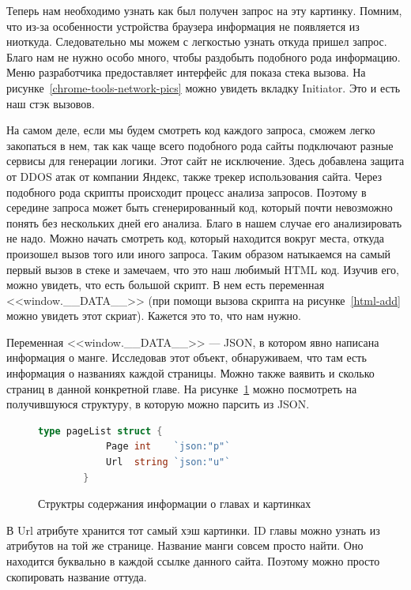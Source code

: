 Теперь нам необходимо узнать как был получен запрос на эту картинку. 
Помним, что из-за особенности устройства браузера информация не появляется из ниоткуда.
Следовательно мы можем с легкостью узнать откуда пришел запрос.
Благо нам не нужно особо много, чтобы раздобыть подобного рода информацию.
Меню разработчика предоставляет интерфейс для показа стека вызова. На рисунке~\ref{chrome-tools-network-pics} можно увидеть вкладку Initiator.
Это и есть наш стэк вызовов.

На самом деле, если мы будем смотреть код каждого запроса, сможем легко закопаться в нем, так как чаще всего подобного рода сайты подключают разные сервисы для генерации логики.
Этот сайт не исключение. Здесь добавлена защита от DDOS атак от компании Яндекс, также трекер использования сайта.
Через подобного рода скрипты происходит процесс анализа запросов. Поэтому в середине запроса может быть сгенерированный код, который почти невозможно понять без нескольких дней его анализа.
Благо в нашем случае его анализировать не надо.
Можно начать смотреть код, который находится вокруг места, откуда произошел вызов того или иного запроса.
Таким образом натыкаемся на самый первый вызов в стеке и замечаем, что это наш любимый HTML код.
Изучив его, можно увидеть, что есть большой скрипт. В нем есть переменная <<window.\_\_DATA\_\_>> (при помощи вызова скрипта на рисунке~\ref{html-add} можно увидеть этот скриат).
Кажется это то, что нам нужно.

Переменная <<window.\_\_DATA\_\_>> --- JSON, в котором явно написана информация о манге.
Исследовав этот объект, обнаруживаем, что там есть информация о названиях каждой страницы. Можно также ваявить и сколько страниц в данной конкретной главе.
На рисунке~\ref{json-structs-parsing} можно посмотреть на получившуюся структуру, в которую можно парсить из JSON.

\begin{figure}
	\begin{lstlisting}[language=go]
		type pageList struct {
            Page int    `json:"p"`
            Url  string `json:"u"`
        }
	\end{lstlisting}
	\caption{Структры содержания информации о главах и картинках}
	\label{json-structs-parsing}
\end{figure}

В Url атрибуте хранится тот самый хэш картинки.
ID главы можно узнать из атрибутов на той же странице.
Название манги совсем просто найти. Оно находится буквально в каждой ссылке данного сайта. Поэтому можно просто скопировать название оттуда.

